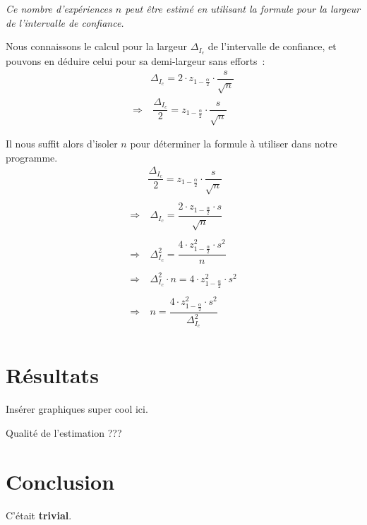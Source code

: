 \documentclass[paper=a4, fontsize=11pt]{scrartcl}
\begin{document}
\textit{Ce nombre d'expériences $n$ peut être estimé en utilisant la formule pour la largeur de l'intervalle de confiance.}

Nous connaissons le calcul pour la largeur \(\Delta_{I_c}\) de l'intervalle de confiance, et pouvons en déduire celui pour sa demi-largeur sans efforts~:
\begin{align*}
  &\Delta_{I_c} = 2\cdot z_{1-\frac{\alpha}{2}}\cdot \dfrac{s}{\sqrt{n}} \\
  \Rightarrow &\ \dfrac{\Delta_{I_c}}{2} = z_{1-\frac{\alpha}{2}}\cdot \dfrac{s}{\sqrt{n}}
\end{align*}

Il nous suffit alors d'isoler $n$ pour déterminer la formule à utiliser dans notre programme.
\begin{align*}
  &\dfrac{\Delta_{I_c}}{2} = z_{1-\frac{\alpha}{2}}\cdot \dfrac{s}{\sqrt{n}} \\ \\
  \Rightarrow &\ \Delta_{I_c} = \dfrac{2\cdot z_{1-\frac{\alpha}{2}}\cdot s}{\sqrt{n}} \\ \\
  \Rightarrow &\ \Delta_{I_c}^2 = \dfrac{4\cdot z_{1-\frac{\alpha}{2}}^2\cdot s^2}{n} \\ \\
  \Rightarrow &\ \Delta_{I_c}^2\cdot n = 4\cdot z_{1-\frac{\alpha}{2}}^2\cdot s^2 \\ \\
  \Rightarrow &\ n = \dfrac{4\cdot z_{1-\frac{\alpha}{2}}^2\cdot s^2}{\Delta_{I_c}^2} \\
\end{align*}

\section{Résultats}
Insérer graphiques super cool ici.

Qualité de l'estimation ???

\section{Conclusion}
C'était \textbf{trivial}.
\end{document}
